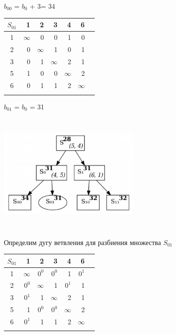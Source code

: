 \documentclass[12pt]{article}
\begin{document}
$b_{00}$ = $b_0$ + 3= 34\\

\begin{flushleft}
 \begin{tabular}{c||rrrrr||c}
$S_{01}$ & 1 &2 & 3 & 4 & 6 & \\
\hline
\hline
1 & $\infty$ & 0 & 0 & 1  & 0 & \\
2 & 0 & $\infty$ & 1 & 0  & 1 & \\
3 & 0 & 1 & $\infty$ & 2  & 1 & \\
5 & 1 & 0 & 0 & $\infty$  & 2 \\
6 & 0 & 1 & 1 & 2 & $\infty$ & \\
\hline
\hline
 &  &   &  &  &  &  \\
\end{tabular}
\end{flushleft}

$b_{01}$ = $b_0$  = 31\\
\begin{flushleft}
 
\includegraphics[width = 7cm, height = 6cm]{pictures/picture_12.jpg}\\
\end{flushleft}
\hspace{6cm}
\begin{flushleft}
 
Определим дугу ветвления для разбиения множества $S_{01}$\\
\end{flushleft}

\begin{flushleft}
 \begin{tabular}{c||rrrrr||c}
$S_{01}$ & 1 &2 & 3 & 4 & 6 & \\
\hline
\hline
1 & $\infty$ & $0^0$ & $0^0$ & 1  & $0^1$ & \\
2 & $0^0$ & $\infty$ & 1 & $0^1$  & 1 & \\
3 & $0^1$ & 1 & $\infty$ & 2  & 1 & \\
5 & 1 & $0^0$ & $0^0$ & $\infty$  & 2 \\
6 & $0^1$ & 1 & 1 & 2 & $\infty$ & \\
\hline
\hline
 &  &   &  &  &  &  \\
\end{tabular}
\end{flushleft}
\end{document}
